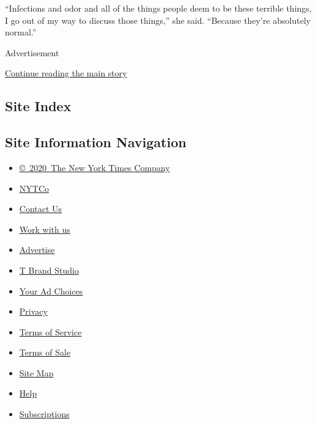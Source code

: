 ``Infections and odor and all of the things people deem to be these
terrible things, I go out of my way to discuss those things,'' she said.
``Because they're absolutely normal.''

Advertisement

\protect\hyperlink{after-bottom}{Continue reading the main story}

\hypertarget{site-index}{%
\subsection{Site Index}\label{site-index}}

\hypertarget{site-information-navigation}{%
\subsection{Site Information
Navigation}\label{site-information-navigation}}

\begin{itemize}
\tightlist
\item
  \href{https://help.nytimes.com/hc/en-us/articles/115014792127-Copyright-notice}{©~2020~The
  New York Times Company}
\end{itemize}

\begin{itemize}
\tightlist
\item
  \href{https://www.nytco.com/}{NYTCo}
\item
  \href{https://help.nytimes.com/hc/en-us/articles/115015385887-Contact-Us}{Contact
  Us}
\item
  \href{https://www.nytco.com/careers/}{Work with us}
\item
  \href{https://nytmediakit.com/}{Advertise}
\item
  \href{http://www.tbrandstudio.com/}{T Brand Studio}
\item
  \href{https://www.nytimes.com/privacy/cookie-policy\#how-do-i-manage-trackers}{Your
  Ad Choices}
\item
  \href{https://www.nytimes.com/privacy}{Privacy}
\item
  \href{https://help.nytimes.com/hc/en-us/articles/115014893428-Terms-of-service}{Terms
  of Service}
\item
  \href{https://help.nytimes.com/hc/en-us/articles/115014893968-Terms-of-sale}{Terms
  of Sale}
\item
  \href{https://spiderbites.nytimes.com}{Site Map}
\item
  \href{https://help.nytimes.com/hc/en-us}{Help}
\item
  \href{https://www.nytimes.com/subscription?campaignId=37WXW}{Subscriptions}
\end{itemize}

